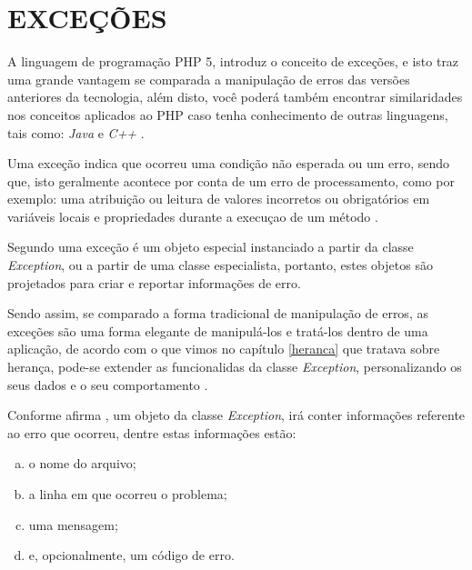 \section{EXCEÇÕES}

A linguagem de programação PHP 5, introduz o conceito de exceções, e isto traz
uma grande vantagem se comparada a manipulação de erros das versões anteriores
da tecnologia, além disto, você poderá também encontrar similaridades nos
conceitos aplicados ao PHP caso tenha conhecimento de outras linguagens, tais
como: \textit{Java} e \textit{C++} \cite{phpObjectsPatternsAndPractice}.

Uma exceção indica que ocorreu uma condição não esperada ou um erro, sendo que,
isto geralmente acontece por conta de um erro de processamento, como por
exemplo: uma atribuição ou leitura de valores incorretos ou obrigatórios em
variáveis locais e propriedades durante a execuçao de um método \cite{learningJava}.

Segundo  uma exceção é um objeto
especial instanciado a partir da classe \textit{Exception}, ou a partir de uma
classe especialista, portanto, estes objetos são projetados para criar e
reportar informações de erro. 

Sendo assim, se comparado a forma tradicional de manipulação de erros, as
exceções são uma forma elegante de manipulá-los e tratá-los dentro de uma
aplicação, de acordo com o que vimos no capítulo \ref{heranca} que
tratava sobre herança, pode-se extender as funcionalidas da classe
\textit{Exception}, personalizando os seus dados e o seu comportamento \cite{phpMasterWriteCuttingEdgeCode}.

Conforme afirma , um objeto da classe 
\textit{Exception}, irá conter informações referente ao erro que ocorreu, dentre
estas informações estão:

\begin{enumerate}[a)]
    \item o nome do arquivo;
    \item a linha em que ocorreu o problema;
    \item uma mensagem;
    \item e, opcionalmente, um código de erro.
\end{enumerate}

